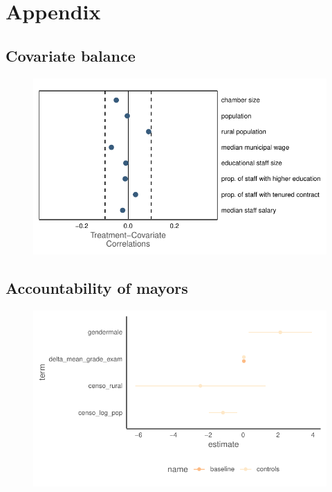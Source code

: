 \documentclass[12pt,a4paper]{article}
\begin{document}
\pagebreak 



\pagebreak

\section*{Appendix}

\subsection{Covariate balance}

\begin{figure}[h]
    \centering
    \includegraphics{plots/covariate_balance.pdf}
\end{figure}

\pagebreak

\subsection{Accountability of mayors}
\label{app:accountability}

\begin{figure}[h]
    \centering
    \includegraphics{plots/accountability_fit.pdf}
\end{figure}
\end{document}
